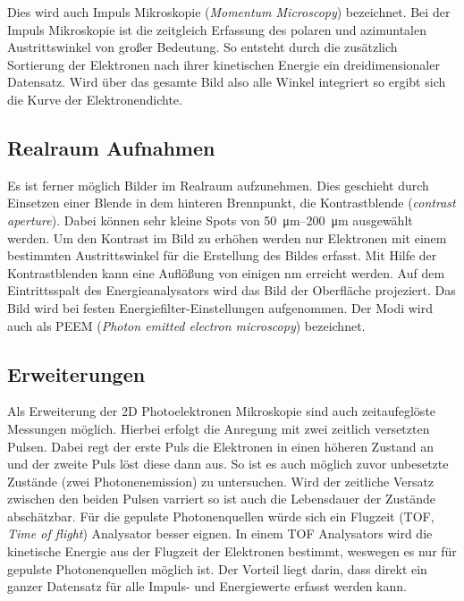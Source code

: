             Dies wird auch Impuls Mikroskopie (\textit{Momentum Microscopy}) bezeichnet.
            Bei der Impuls Mikroskopie ist die zeitgleich Erfassung des polaren und azimuntalen Austrittswinkel von großer Bedeutung. 
            So entsteht durch die zusätzlich Sortierung der Elektronen nach ihrer kinetischen Energie ein dreidimensionaler Datensatz.
            Wird über das gesamte Bild also alle Winkel integriert so ergibt sich die Kurve der Elektronendichte.

        \subsection{Realraum Aufnahmen}
            Es ist ferner möglich Bilder im Realraum aufzunehmen.
            Dies geschieht durch Einsetzen einer Blende in dem hinteren Brennpunkt, die Kontrastblende (\textit{contrast aperture}).
            Dabei können sehr kleine Spots von \SIrange{50}{200}{\micro\meter} ausgewählt werden.
            Um den Kontrast im Bild zu erhöhen werden nur Elektronen mit einem bestimmten Austrittswinkel für die Erstellung des Bildes erfasst.
            Mit Hilfe der Kontrastblenden kann eine Auflößung von einigen \si{\nano\meter} erreicht werden. 
            Auf dem Eintrittsspalt des Energieanalysators wird das Bild der Oberfläche projeziert.
            Das Bild wird bei festen Energiefilter-Einstellungen aufgenommen.
            Der Modi wird auch als PEEM (\textit{Photon emitted electron microscopy}) bezeichnet.

        \subsection{Erweiterungen}
            Als Erweiterung der 2D Photoelektronen Mikroskopie sind auch zeitaufeglöste Messungen möglich.
            Hierbei erfolgt die Anregung mit zwei zeitlich versetzten Pulsen. 
            Dabei regt der erste Puls die Elektronen in einen höheren Zustand an und der zweite Puls löst diese dann aus.
            So ist es auch möglich zuvor unbesetzte Zustände (zwei Photonenemission) zu untersuchen.
            Wird der zeitliche Versatz zwischen den beiden Pulsen varriert so ist auch die Lebensdauer der Zustände abschätzbar.
            Für die gepulste Photonenquellen würde sich ein Flugzeit (TOF, \textit{Time of flight}) Analysator besser eignen.
            In einem TOF Analysators wird die kinetische Energie aus der Flugzeit der Elektronen bestimmt, weswegen es nur für gepulste Photonenquellen möglich ist.
            Der Vorteil liegt darin, dass direkt ein ganzer Datensatz für alle Impuls- und Energiewerte erfasst werden kann.

